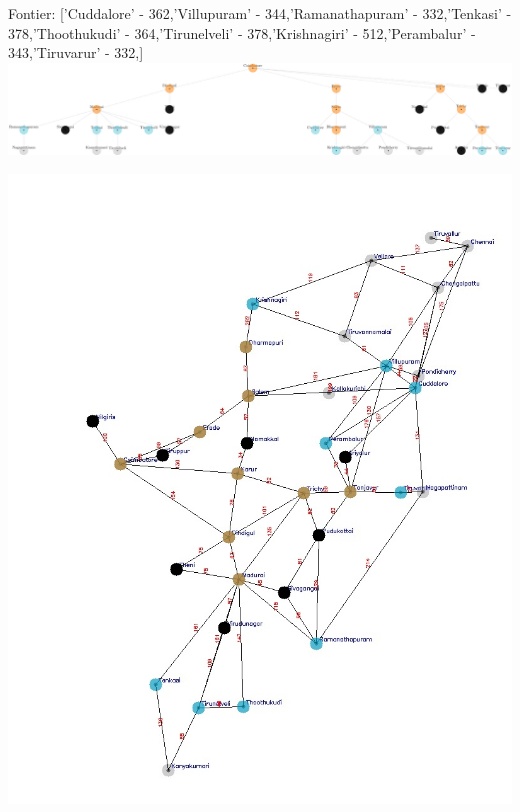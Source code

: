 \documentclass[xcolor=table]{beamer}
\begin{document}
\begin{frame}
  { \tiny Fontier: ['Cuddalore' - 362,'Villupuram' - 344,'Ramanathapuram' - 332,'Tenkasi' - 378,'Thoothukudi' - 364,'Tirunelveli' - 378,'Krishnagiri' - 512,'Perambalur' - 343,'Tiruvarur' - 332,]}
  \includegraphics[width=1\textwidth]{../UCSNodes/27-1.png}
  \begin{center}
    \includegraphics[height=0.6\textheight]{../UCSoutput/tamilUCS25.jpg}
  \end{center}
\end{frame}
\end{document}
